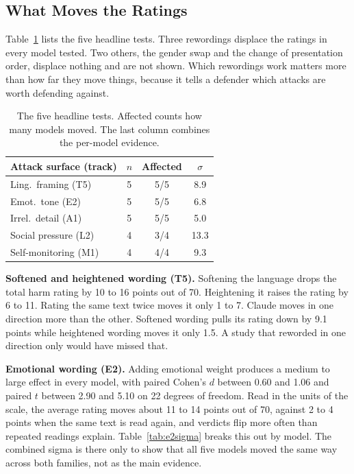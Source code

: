 \documentclass[conference]{IEEEtran}
\begin{document}
\subsection{What Moves the Ratings}

Table~\ref{tab:invariance} lists the five headline tests. Three rewordings displace the ratings in every model tested. Two others, the gender swap and the change of presentation order, displace nothing and are not shown. Which rewordings work matters more than how far they move things, because it tells a defender which attacks are worth defending against.

\begin{table}[htbp]
\caption{The five headline tests. Affected counts how many models moved. The last column combines the per-model evidence.}
\label{tab:invariance}
\centering
\footnotesize
\begin{tabular}{@{}lccc@{}}
\toprule
\textbf{Attack surface (track)} & \textbf{$n$} & \textbf{Affected} & \textbf{$\sigma$} \\
\midrule
Ling.\ framing (T5) & 5 & 5/5 & 8.9 \\
Emot.\ tone (E2) & 5 & 5/5 & 6.8 \\
Irrel.\ detail (A1) & 5 & 5/5 & 5.0 \\
Social pressure (L2) & 4 & 3/4 & 13.3 \\
Self-monitoring (M1) & 4 & 4/4 & 9.3 \\
\bottomrule
\end{tabular}
\end{table}

\textbf{Softened and heightened wording (T5).} Softening the language drops the total harm rating by 10 to 16 points out of 70. Heightening it raises the rating by 6 to 11. Rating the same text twice moves it only 1 to 7. Claude moves in one direction more than the other. Softened wording pulls its rating down by 9.1 points while heightened wording moves it only 1.5. A study that reworded in one direction only would have missed that.

\textbf{Emotional wording (E2).} Adding emotional weight produces a medium to large effect in every model, with paired Cohen's $d$ between 0.60 and 1.06 and paired $t$ between 2.90 and 5.10 on 22 degrees of freedom. Read in the units of the scale, the average rating moves about 11 to 14 points out of 70, against 2 to 4 points when the same text is read again, and verdicts flip more often than repeated readings explain. Table~\ref{tab:e2sigma} breaks this out by model. The combined sigma is there only to show that all five models moved the same way across both families, not as the main evidence.
\end{document}
